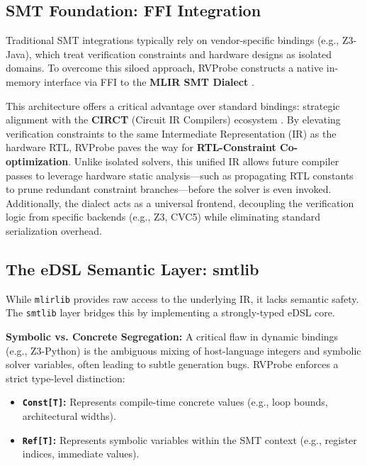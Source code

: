 \documentclass[sigconf]{acmart}
\begin{document}
\subsection{SMT Foundation: FFI Integration}\label{Sec3.2}

Traditional SMT integrations typically rely on vendor-specific bindings (e.g., Z3-Java), which treat verification constraints and hardware designs as isolated domains. To overcome this siloed approach, RVProbe constructs a native in-memory interface via FFI to the \textbf{MLIR SMT Dialect} \cite{23}. 

This architecture offers a critical advantage over standard bindings: strategic alignment with the \textbf{CIRCT} (Circuit IR Compilers) ecosystem \cite{27}. By elevating verification constraints to the same Intermediate Representation (IR) as the hardware RTL, RVProbe paves the way for \textbf{RTL-Constraint Co-optimization}. Unlike isolated solvers, this unified IR allows future compiler passes to leverage hardware static analysis—such as propagating RTL constants to prune redundant constraint branches—before the solver is even invoked. Additionally, the dialect acts as a universal frontend, decoupling the verification logic from specific backends (e.g., Z3, CVC5) while eliminating standard serialization overhead.

\subsection{The eDSL Semantic Layer: smtlib}\label{Sec3.3}

While \texttt{mlirlib} provides raw access to the underlying IR, it lacks semantic safety. The \texttt{smtlib} layer bridges this by implementing a strongly-typed eDSL core.

\textbf{Symbolic vs. Concrete Segregation:}
A critical flaw in dynamic bindings (e.g., Z3-Python) is the ambiguous mixing of host-language integers and symbolic solver variables, often leading to subtle generation bugs. RVProbe enforces a strict type-level distinction:
\begin{itemize}
    \item \textbf{\texttt{Const[T]}:} Represents compile-time concrete values (e.g., loop bounds, architectural widths).
    \item \textbf{\texttt{Ref[T]}:} Represents symbolic variables within the SMT context (e.g., register indices, immediate values).
\end{itemize}
\end{document}
